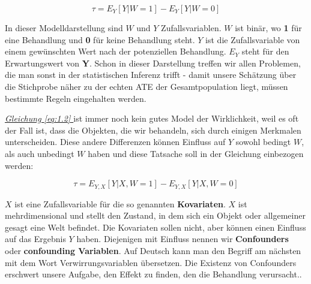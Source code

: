 \documentclass[12pt,a4paper,twoside]{scrartcl}
\numberwithin{equation}{section}
\renewcommand*{\refeq}[1]{\emph{\hyperref[#1]{Gleichung \ref*{#1} }}}
\begin{document}
\begin{equation}\label{eq:1.2}
  \tau = E_Y[Y|W = 1] - E_Y[Y|W = 0]
\end{equation}

\noindent
In dieser Modelldarstellung sind $W$ und $Y$ Zufallsvariablen. $W$ ist binär, wo \textbf{1} für eine Behandlung und \textbf{0} für keine Behandlung steht. $Y$ ist die Zufallsvariable von einem gewünschten Wert nach der potenziellen Behandlung. $E_Y$ steht für den Erwartungswert von \textbf{Y}. Schon in dieser Darstellung treffen wir allen Problemen, die man sonst in der statistischen Inferenz trifft - damit unsere Schätzung über die Stichprobe näher zu der echten ATE der Gesamtpopulation liegt, müssen bestimmte Regeln eingehalten werden.\par

\noindent
\refeq{eq:1.2} ist immer noch kein gutes Model der Wirklichkeit, weil es oft der Fall ist, dass die Objekten, die wir behandeln, sich durch einigen Merkmalen unterscheiden. Diese andere Differenzen können Einfluss auf $Y$ sowohl bedingt $W$, als auch unbedingt $W$ haben und diese Tatsache soll in der Gleichung einbezogen werden:\par

\begin{equation}\label{eq:1.3}
  \tau = E_{Y,X}[Y|X,W = 1] - E_{Y,X}[Y|X,W = 0]
\end{equation}       	

\noindent 
$X$ ist eine Zufallsvariable für die so genannten \textbf{Kovariaten}. $X$ ist mehrdimensional und stellt den Zustand, in dem sich ein Objekt oder allgemeiner gesagt eine Welt befindet. Die Kovariaten sollen nicht, aber können einen Einfluss auf das Ergebnis $Y$ haben. Diejenigen mit Einfluss nennen wir \textbf{Confounders} oder \textbf{confounding Variablen}. Auf Deutsch kann man den Begriff am nächsten mit dem Wort Verwirrungsvariablen übersetzen. Die Existenz von Confounders erschwert unsere Aufgabe, den Effekt zu finden, den die Behandlung verursacht.\cite{vanderweele2013definition}. \par
\end{document}
